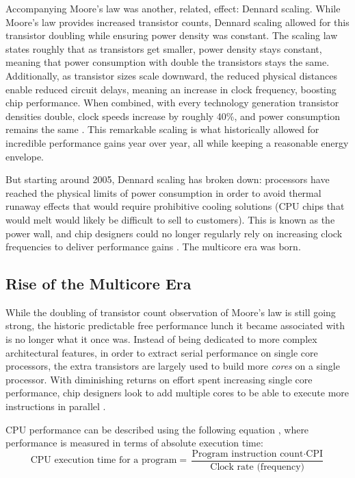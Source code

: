 \documentclass[bsc,frontabs,singlespacing,parskip,deptreport,normalheadings]{infthesis}
\begin{document}
Accompanying Moore's law was another, related, effect: Dennard scaling. While
Moore's law provides increased transistor counts, Dennard scaling allowed for
this transistor doubling while ensuring power density was constant. The scaling
law states roughly that as transistors get smaller, power density stays
constant, meaning that power consumption with double the transistors stays the
same. Additionally, as transistor sizes scale downward, the reduced physical
distances enable reduced circuit delays, meaning an increase in clock frequency,
boosting chip performance. When combined, with every technology generation
transistor densities double, clock speeds increase by roughly 40\%, and power
consumption remains the same \cite{borkar_future_2011}. This remarkable scaling
is what historically allowed for incredible performance gains year over year,
all while keeping a reasonable energy envelope.

But starting around 2005, Dennard scaling has broken down: processors have
reached the physical limits of power consumption in order to avoid thermal
runaway effects that would require prohibitive cooling solutions (CPU chips that
would melt would likely be difficult to sell to customers). This is known as the
power wall, and chip designers could no longer regularly rely on increasing
clock frequencies to deliver performance gains \cite{parkhurst_single_2006}. The
multicore era was born.

\subsection{Rise of the Multicore Era}

While the doubling of transistor count observation of Moore's law is still going
strong, the historic predictable free performance lunch it became associated
with is no longer what it once was. Instead of being dedicated to more complex
architectural features, in order to extract serial performance on single core
processors, the extra transistors are largely used to build more \textit{cores}
on a single processor. With diminishing returns on effort spent increasing
single core performance, chip designers look to add multiple cores to be able to
execute more instructions in parallel \cite{patterson_trouble_2010}.

CPU performance can be described using the following equation
\cite{patterson_computer_2021}, where performance is measured in terms of
absolute execution time: \[ \text{CPU execution time for a program} =
\frac{\text{Program instruction count} \cdot \text{CPI}}{\text{Clock rate
(frequency)}} \]
\end{document}
